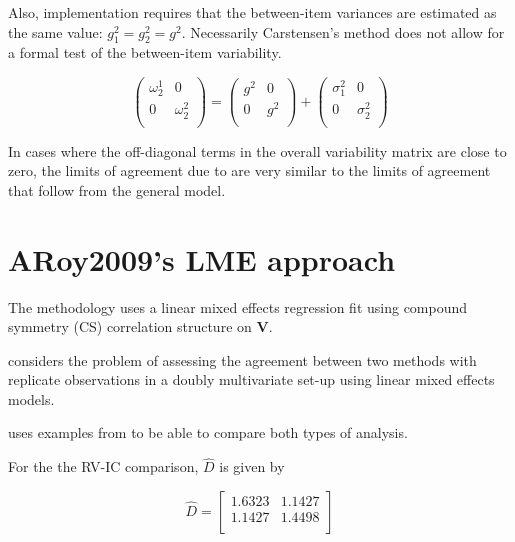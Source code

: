 \documentclass[12pt, a4paper]{report}
\theoremstyle{plain}
\theoremstyle{definition}
\theoremstyle{remark}
\begin{document}
	Also, implementation requires that the between-item variances are
	estimated as the same value: $g^2_1 = g^2_2 = g^2$. Necessarily
	Carstensen's method does not allow for a formal test of the
	between-item variability.
	
	\[\left(\begin{array}{cc}
	\omega^1_2  & 0 \\
	0 & \omega^2_2 \\
	\end{array}  \right)
	=  \left(
	\begin{array}{cc}
	g^2  & 0 \\
	0 & g^2 \\
	\end{array} \right)+
	\left(
	\begin{array}{cc}
	\sigma^2_1  & 0 \\
	0 & \sigma^2_2 \\
	\end{array}\right)
	\]
	
	In cases where the off-diagonal terms in the overall variability
	matrix are close to zero, the limits of agreement due to
	\citet{BXC2008} are very similar to the limits of agreement that
	follow from the general model.
	
	
	
	\section{ARoy2009's LME approach}
	
	
	The methodology uses a linear mixed effects regression fit using
	compound symmetry (CS) correlation structure on \textbf{V}.
	
	
	
	\bigskip
	
	\citet{AARoy20092009} considers the problem of assessing the agreement
	between two methods with replicate observations in a doubly
	multivariate set-up using linear mixed effects models.
	
	
	\citet{AARoy20092009} uses examples from \citet{BA86} to be able to
	compare both types of analysis.
	
	
	
	For the the RV-IC comparison, $\hat{D}$ is given by
	
	
	\begin{equation}
	\hat{D}= \left[ \begin{array}{cc}
	1.6323 & 1.1427  \\
	1.1427 & 1.4498 \\
	\end{array} \right]
	\end{equation}
	
\end{document}
